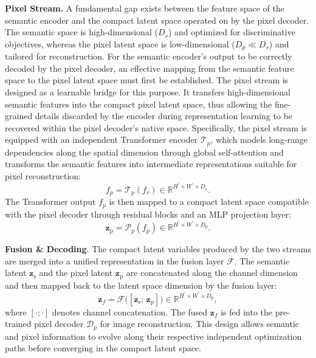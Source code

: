\documentclass[runningheads]{llncs}
\begin{document}
\noindent\textbf{Pixel Stream.}
A fundamental gap exists between the feature space of the semantic encoder and the compact latent space operated on by the pixel decoder. The semantic space is high-dimensional ($D_s$) and optimized for discriminative objectives, whereas the pixel latent space is low-dimensional ($D_p \ll D_s$) and tailored for reconstruction.
For the semantic encoder's output to be correctly decoded by the pixel decoder, an effective mapping from the semantic feature space to the pixel latent space must first be established. The pixel stream is designed as a learnable bridge for this purpose.
It transfers high-dimensional semantic features into the compact pixel latent space, thus allowing the fine-grained details discarded by the encoder during representation learning to be recovered within the pixel decoder's native space.
Specifically, the pixel stream is equipped with an independent Transformer encoder $\mathcal{T}_p$, which models long-range dependencies along the spatial dimension through global self-attention and transforms the semantic features into intermediate representations suitable for pixel reconstruction:
$$f_p = \mathcal{T}_p(f_v) \in \mathbb{R}^{H^{'} \times W^{'} \times D_s}.$$
The Transformer output $f_p$ is then mapped to a compact latent space compatible with the pixel decoder through residual blocks and an MLP projection layer:
$$\mathbf{z}_{\text{p}} = \mathcal{P}_p(f_p) \in \mathbb{R}^{H^{'} \times W^{'} \times D_p}.$$

\noindent\textbf{Fusion \& Decoding}.
The compact latent variables produced by the two streams are merged into a unified representation in the fusion layer $\mathcal{F}$. The semantic latent $\mathbf{z}_{\text{s}}$ and the pixel latent $\mathbf{z}_{\text{p}}$ are concatenated along the channel dimension and then mapped back to the latent space dimension by the fusion layer:
$$\mathbf{z}_f = \mathcal{F}\big([\mathbf{z}_{\text{s}};\, \mathbf{z}_{\text{p}}]\big) \in \mathbb{R}^{H^{'} \times W^{'} \times D_p},$$
where $[\cdot;\cdot]$ denotes channel concatenation. The fused $\mathbf{z}_f$ is fed into the pre-trained pixel decoder $\mathcal{D}_p$ for image reconstruction. This design allows semantic and pixel information to evolve along their respective independent optimization paths before converging in the compact latent space.
\end{document}
